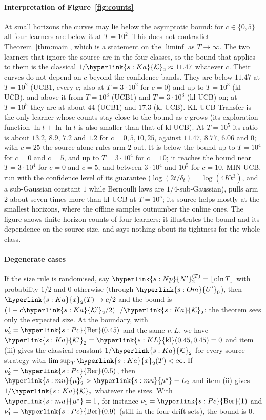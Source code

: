 \documentclass[11pt]{article}
\newcommand{\sy}[2]{\hyperlink{#1}{#2}}
\newcommand{\Ber}{\sy{s:Pc}{\mathrm{Ber}}}
\newcommand{\kl}{\sy{s:KL}{\mathrm{kl}}}
\newcommand{\mean}{\sy{s:mu}{\mu}}
\newcommand{\ms}{\sy{s:mu}{\mu^{\star}}}
\newcommand{\Up}{\sy{s:Om}{U'}}
\newcommand{\Np}{\sy{s:Np}{N'}}
\newcommand{\Ka}{\sy{s:Ka}{\mathcal{K}}}
\newcommand{\Kp}{\sy{s:Ka}{\mathcal{K}'}}
\newcommand{\xr}{\sy{s:Ka}{x}}
\begin{document}
\paragraph{Interpretation of Figure~\ref{fig:counts}} At small horizons the curves may lie below
the asymptotic bound: for $c\in\{0,5\}$ all four learners are below it at $T=10^2$. This does not
contradict Theorem~\ref{thm:main}, which is a statement on the $\liminf$ as $T\to\infty$. The two
learners that ignore the source are in the four classes, so the bound that applies to them is the
classical $1/\Ka_2\approx11.47$ whatever $c$. Their curves do not depend on $c$ beyond the
confidence bands. They are below $11.47$ at $T=10^2$ (UCB1, every $c$; also at $T=3\cdot10^2$ for
$c=0$) and up to $T=10^3$ (kl-UCB), and above it from $T=10^3$ (UCB1) and $T=3\cdot10^3$ (kl-UCB)
on; at $T=10^5$ they are at about $44$ (UCB1) and $17.3$ (kl-UCB). KL-UCB-Transfer is the only learner whose counts stay
close to the bound as $c$ grows (its exploration function $\ln t+\ln\ln t$ is also smaller than
that of kl-UCB). At $T=10^5$ its ratio is about $13.2$, $8.9$, $7.2$ and $1.2$ for $c=0,5,10,25$,
against $11.47$, $8.77$, $6.06$ and $0$; with $c=25$ the source alone rules arm $2$ out. It is
below the bound up to $T=10^4$ for $c=0$ and $c=5$, and up to $T=3\cdot10^4$ for $c=10$; it
reaches the bound near $T=3\cdot10^4$ for $c=0$ and $c=5$, and between $3\cdot10^4$ and $10^5$
for $c=10$. MIN-UCB, run with the confidence level of its guarantee
($\log(2t/\delta_t)=\log(4Kt^3)$, and a sub-Gaussian constant $1$ while Bernoulli laws are
$1/4$-sub-Gaussian), pulls arm $2$ about seven times more than kl-UCB at $T=10^5$; its source helps
mostly at the smallest horizons, where the offline samples outnumber the online ones. The figure
shows finite-horizon counts of four learners: it illustrates the bound and its dependence on the
source size, and says nothing about its tightness for the whole class.

\paragraph{Degenerate cases} If the size rule is randomised, say $\Np^{(T)}_2=\lfloor c\ln T\rfloor$
with probability $1/2$ and $0$ otherwise (through $\Up_0$), then $\xr_2(T)\to c/2$ and the bound is
$(1-c\Kp_2/2)_+/\Ka_2$: the theorem sees only the expected size. At the boundary, with
$\nu'_2=\Ber(0.45)$ and the same $\nu,L$, we have $\Kp_2=\kl(0.45,0.45)=0$ and item (iii) gives the
classical constant $1/\Ka_2$ for every source strategy with $\limsup_T\xr_2(T)<\infty$. If
$\nu'_2=\Ber(0.5)$, then $\mean'_2>\ms-L_2$ and item (ii) gives $1/\Ka_2$ whatever the sizes. With
$\ms=1$, for instance $\nu_1=\Ber(1)$ and $\nu'_1=\Ber(0.9)$ (still in the four drift sets), the
bound is $0$.
\end{document}
